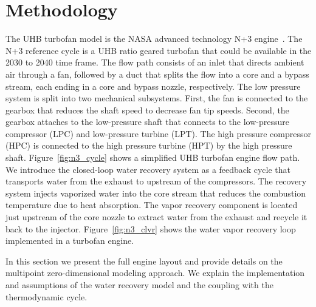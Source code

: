 \documentclass[conf]{new-aiaa}
\begin{document}
\section{Methodology}
\label{sec:method}
The UHB turbofan model is the NASA advanced technology N+3 engine~\cite{Jones2017a}.
The N+3 reference cycle is a UHB ratio geared turbofan that could be available in the 2030 to 2040 time frame.
The flow path consists of an inlet that directs ambient air through a fan, followed by a duct that splits the flow into a core and a bypass stream, each ending in a core and bypass nozzle, respectively.
The low pressure system is split into two mechanical subsystems.
First, the fan is connected to the gearbox that reduces the shaft speed to decrease fan tip speeds.
Second, the gearbox attaches to the low-pressure shaft that connects to the low-pressure compressor (LPC) and low-pressure turbine (LPT).
The high pressure compressor (HPC) is connected to the high pressure turbine (HPT) by the high pressure shaft.
Figure~\ref{fig:n3_cycle} shows a simplified UHB turbofan engine flow path.
We introduce the closed-loop water recovery system as a feedback cycle that transports water from the exhaust to upstream of the compressors.
The recovery system injects vaporized water into the core stream that reduces the combustion temperature due to heat absorption.
The vapor recovery component is located just upstream of the core nozzle to extract water from the exhaust and recycle it back to the injector.
Figure~\ref{fig:n3_clvr} shows the water vapor recovery loop implemented in a turbofan engine.

In this section we present the full engine layout and provide details on the multipoint zero-dimensional modeling approach.
We explain the implementation and assumptions of the water recovery model and the coupling with the thermodynamic cycle.
\end{document}
